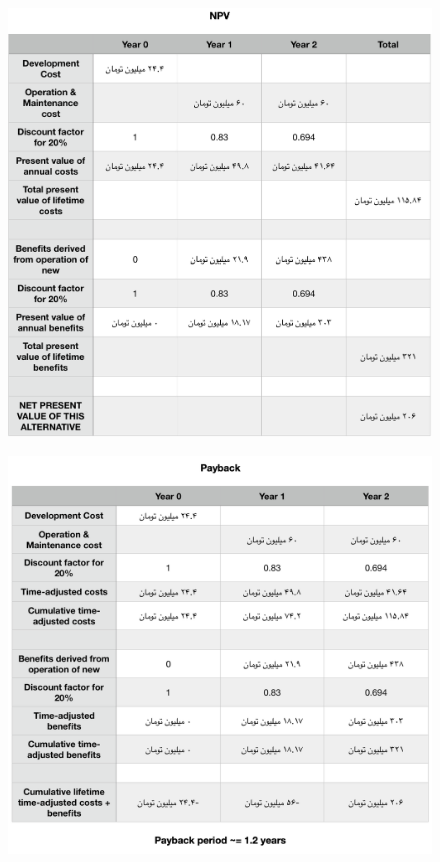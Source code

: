 \documentclass{article}
\begin{document}
\begin{center}
\begin{figure}[htp]
\includegraphics[width = 1\textwidth]{NPV1.png}
\caption{}
\label{npv1}
\end{figure}

\begin{figure}[htp]
\includegraphics[width = 1\textwidth]{PB1.png}
\caption{}
\label{pb1}
\end{figure}

\end{center}
\end{document}

